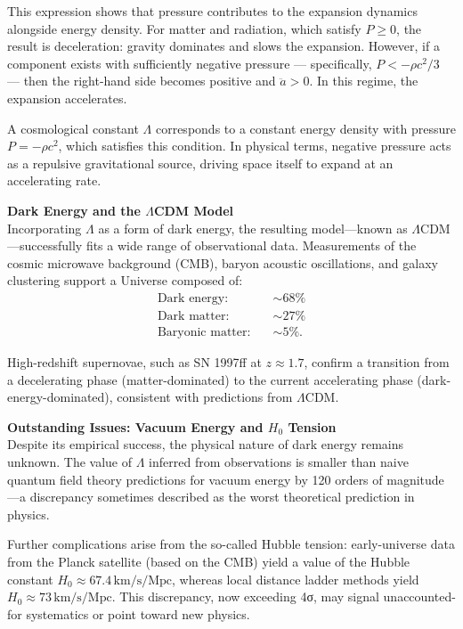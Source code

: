 \begin{technical}
This expression shows that pressure contributes to the expansion dynamics alongside energy density. For matter and radiation, which satisfy \(P \geq 0\), the result is deceleration: gravity dominates and slows the expansion. However, if a component exists with sufficiently negative pressure — specifically, \(P < -\rho c^2/3\) — then the right-hand side becomes positive and \(\ddot{a} > 0\). In this regime, the expansion accelerates.


A cosmological constant \(\Lambda\) corresponds to a constant energy density with pressure \(P = -\rho c^2\), which satisfies this condition. In physical terms, negative pressure acts as a repulsive gravitational source, driving space itself to expand at an accelerating rate.

\medskip

\noindent\textbf{Dark Energy and the \(\Lambda\)CDM Model}\\
Incorporating \(\Lambda\) as a form of dark energy, the resulting model—known as \(\Lambda\)CDM—successfully fits a wide range of observational data. Measurements of the cosmic microwave background (CMB), baryon acoustic oscillations, and galaxy clustering support a Universe composed of:
\[
\begin{aligned}
\text{Dark energy:} \quad &\sim 68\% \\
\text{Dark matter:} \quad &\sim 27\% \\
\text{Baryonic matter:} \quad &\sim 5\%.
\end{aligned}
\]

High-redshift supernovae, such as SN 1997ff at \(z \approx 1.7\), confirm a transition from a decelerating phase (matter-dominated) to the current accelerating phase (dark-energy-dominated), consistent with predictions from \(\Lambda\)CDM.

\medskip

\noindent\textbf{Outstanding Issues: Vacuum Energy and \(H_0\) Tension}\\
Despite its empirical success, the physical nature of dark energy remains unknown. The value of \(\Lambda\) inferred from observations is smaller than naive quantum field theory predictions for vacuum energy by 120 orders of magnitude—a discrepancy sometimes described as the worst theoretical prediction in physics.

Further complications arise from the so-called Hubble tension: early-universe data from the Planck satellite (based on the CMB) yield a value of the Hubble constant \(H_0 \approx 67.4\,\text{km/s/Mpc}\), whereas local distance ladder methods yield \(H_0 \approx 73\,\text{km/s/Mpc}\). This discrepancy, now exceeding 4σ, may signal unaccounted-for systematics or point toward new physics.


\end{technical}
